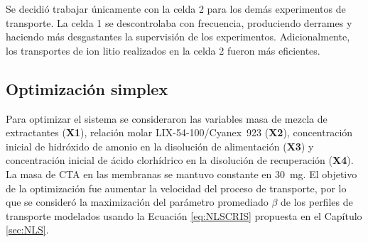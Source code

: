 Se decidió trabajar únicamente con la celda 2 para los demás experimentos de transporte. La celda 1 se descontrolaba con frecuencia, produciendo derrames y haciendo más desgastantes la supervisión de los experimentos. Adicionalmente, los transportes de ion litio realizados en la celda 2 fueron más eficientes. 
 



\subsection{Optimización simplex}
Para optimizar el sistema se consideraron las variables masa de mezcla de extractantes (\textbf{X1}), relación molar LIX-54-100/Cyanex~923 (\textbf{X2}), concentración inicial de hidróxido de amonio en la disolución de alimentación (\textbf{X3}) y concentración inicial de ácido clorhídrico en la disolución de recuperación (\textbf{X4}). La masa de \ac{CTA} en las membranas se mantuvo constante en 30~mg. El objetivo de la optimización fue aumentar la velocidad del proceso de transporte, por lo que se consideró la maximización del parámetro promediado $\beta$ de los perfiles de transporte modelados usando la Ecuación \ref{eq:NLSCRIS} propuesta en el Capítulo \ref{sec:NLS}.

